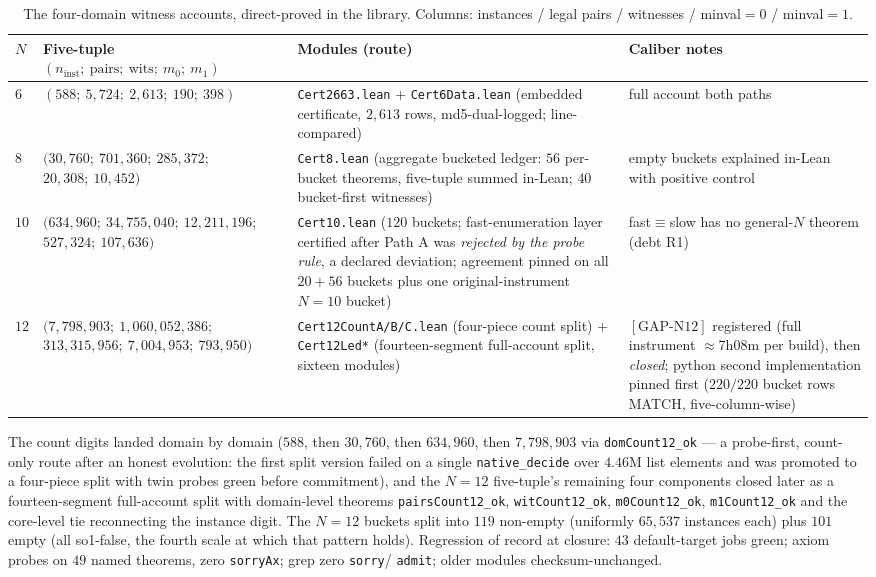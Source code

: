 \begin{table}[ht]
\centering\small
\caption{The four-domain witness accounts, direct-proved in the library. Columns:
instances / legal pairs / witnesses / minval$=0$ / minval$=1$.}
\label{tab:leanaccounts}
\begin{tabular}{p{0.8cm} p{4.9cm} p{3.5cm} p{4.4cm}}
\hline
$N$ & Five-tuple $(n_{\mathrm{inst}};\ \mathrm{pairs};\ \mathrm{wits};\ m_0;\ m_1)$ &
Modules (route) & Caliber notes \\
\hline
$6$ & $(588;\ 5{,}724;\ 2{,}613;\ 190;\ 398)$ &
  \texttt{Cert2663.lean} + \texttt{Cert6Data.lean} (embedded certificate, $2{,}613$ rows,
  md5-dual-logged; line-compared) & full account both paths \\
$8$ & $(30{,}760;\ 701{,}360;\ 285{,}372;$
  $20{,}308;\ 10{,}452)$ &
  \texttt{Cert8.lean} (aggregate bucketed ledger: $56$ per-bucket theorems, five-tuple
  summed in-Lean; $40$ bucket-first witnesses) & empty buckets explained in-Lean with
  positive control \\
$10$ & $(634{,}960;\ 34{,}755{,}040;\ 12{,}211{,}196;$
  $527{,}324;\ 107{,}636)$ &
  \texttt{Cert10.lean} ($120$ buckets; fast-enumeration layer certified after Path A was
  \emph{rejected by the probe rule}, a declared deviation; agreement pinned on all
  $20+56$ buckets plus one original-instrument $N{=}10$ bucket) & fast$\equiv$slow has no
  general-$N$ theorem (debt R1) \\
$12$ & $(7{,}798{,}903;\ 1{,}060{,}052{,}386;$
  $313{,}315{,}956;\ 7{,}004{,}953;\ 793{,}950)$ & \texttt{Cert12CountA\allowbreak/B\allowbreak/C.lean} (four-piece count split) +
  \texttt{Cert12Led*} (fourteen-segment full-account split, sixteen modules) &
  $[\mathrm{GAP}\mbox{-}\mathrm{N12}]$ registered (full instrument $\approx$7h08m per
  build), then \emph{closed}; python second implementation pinned first ($220/220$
  bucket rows MATCH, five-column-wise) \\
\hline
\end{tabular}
\end{table}

The count digits landed domain by domain ($588$, then $30{,}760$, then $634{,}960$, then
$7{,}798{,}903$ via \texttt{domCount12\_ok} --- a probe-first, count-only route after an
honest evolution: the first split version failed on a single \texttt{native\_decide} over
$4.46$M list elements and was promoted to a four-piece split with twin probes green before
commitment), and the $N{=}12$ five-tuple's remaining four components closed later as a
fourteen-segment full-account split with domain-level theorems
\texttt{pairsCount12\_ok}, \texttt{witCount12\_ok}, \texttt{m0Count12\_ok},
\texttt{m1Count12\_ok} and the core-level tie reconnecting the instance digit. The
$N{=}12$ buckets split into $119$ non-empty (uniformly $65{,}537$ instances each) plus
$101$ empty (all so1-false, the fourth scale at which that pattern holds). Regression of
record at closure: $43$ default-target jobs green; axiom probes on $49$ named
theorems, zero \texttt{sorryAx}; grep zero \texttt{sorry}/%
\texttt{admit}; older modules checksum-unchanged.

